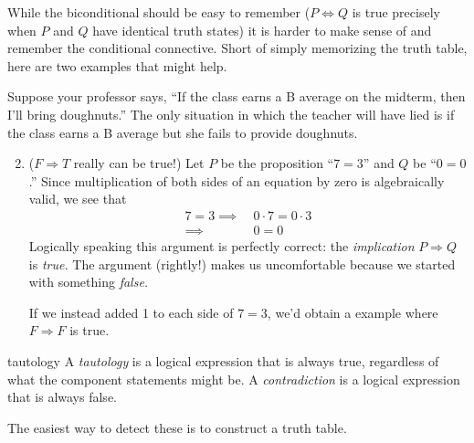 
While the biconditional should be easy to remember ($P\Longleftrightarrow Q$ is true precisely when $P$ and $Q$ have identical truth states) it is harder to make sense of and remember the conditional connective. Short of simply memorizing the truth table, here are two examples that might help.

\begin{examples}{}{}
	\exstart Suppose your professor says, ``If the class earns a B average on the midterm, then I'll bring doughnuts.'' The only situation in which the teacher will have lied is if the class earns a B average but she fails to provide doughnuts.
	\begin{enumerate}\setcounter{enumi}{1}
	  \item ($F\Longrightarrow T$ really can be true!) Let $P$ be the proposition ``$7=3$'' and $Q$ be ``$0=0$.'' Since multiplication of both sides of an equation by zero is algebraically valid, we see that
	  \begin{align*}
			7=3\implies\ &0\cdot 7=0\cdot 3\tag*{(If $7=3$, then 0 times 7 equals 0 times 3)}\\
			\implies\ &0=0\tag*{(then 0 equals 0)}
		\end{align*}
	  Logically speaking this argument is perfectly correct: the \emph{implication} $P\Longrightarrow Q$ is \emph{true.} The argument (rightly!) makes us uncomfortable because we started with something \emph{false.}\par
	  If we instead added 1 to each side of $7=3$, we'd obtain a example where $F\Longrightarrow F$ is true.
	\end{enumerate}
\end{examples}





\begin{defn}{}{tautology}
	A \emph{tautology} is a logical expression that is always true, regardless of what the component statements might be.\smallbreak
	A \emph{contradiction} is a logical expression that is always false.
\end{defn}

The easiest way to detect these is to construct a truth table.

